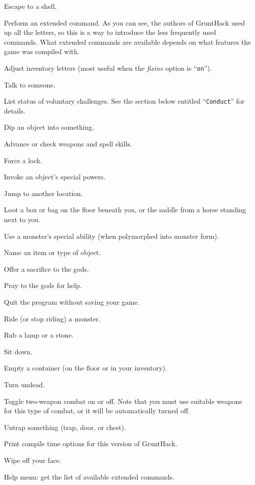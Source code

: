 Escape to a shell.
\item[\tb{\#}]
Perform an extended command.  As you can see, the authors of GruntHack
used up all the letters, so this is a way to introduce the less frequently
used commands.
What extended commands are available depends on what features the game was
compiled with.
\item[\tb{\#adjust}]
Adjust inventory letters (most useful when the
{\it fixinv }
option is ``{\tt on}'').
\item[\tb{\#chat}]
Talk to someone.
\item[\tb{\#conduct}]
List status of voluntary challenges.  See the section below entitled
``{\tt Conduct}'' for details.
\item[\tb{\#dip}]
Dip an object into something.
\item[\tb{\#enhance}]
Advance or check weapons and spell skills.
\item[\tb{\#force}]
Force a lock.
\item[\tb{\#invoke}]
Invoke an object's special powers.
\item[\tb{\#jump}]
Jump to another location.
\item[\tb{\#loot}]
Loot a box or bag on the floor beneath you, or the saddle 
from a horse standing next to you.
\item[\tb{\#monster}]
Use a monster's special ability (when polymorphed into monster form).
\item[\tb{\#name}]
Name an item or type of object.
\item[\tb{\#offer}]
Offer a sacrifice to the gods.
\item[\tb{\#pray}]
Pray to the gods for help.
\item[\tb{\#quit}]
Quit the program without saving your game.
\item[\tb{\#ride}]
Ride (or stop riding) a monster.
\item[\tb{\#rub}]
Rub a lamp or a stone.
\item[\tb{\#sit}]
Sit down.
\item[\tb{\#tip}]
Empty a container (on the floor or in your inventory).
\item[\tb{\#turn}]
Turn undead.
\item[\tb{\#twoweapon}]
Toggle two-weapon combat on or off.  Note that you must
use suitable weapons for this type of combat, or it will
be automatically turned off.
\item[\tb{\#untrap}]
Untrap something (trap, door, or chest).
\item[\tb{\#version}]
Print compile time options for this version of GruntHack.
\item[\tb{\#wipe}]
Wipe off your face.
\item[\tb{\#?}]
Help menu:  get the list of available extended commands.

